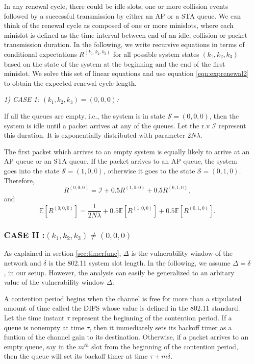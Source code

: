 \documentclass[10pt,conference]{IEEEtran}
\newcommand{\renew}{{R}}
\newcommand{\state}{\mathcal{S}}
\newcommand{\idletime}{\mathcal{I}}
\begin{document}
In any renewal cycle, there could be idle slots, one or more collision events followed by a successful transmission by either an AP or a STA queue.
 We can think of the renewal cycle as composed of one or more minislots, where each minislot is defined as the time interval between end of an idle, collision or  packet transmission duration.
 In the following, we write recursive equations in terms of conditional expectations $\renew^{(k_{1},k_{2},k_{3})}$ for all possible system states $(k_{1},k_{2},k_{3})$ based on the state of the system at 
the beginning and the end of the first minislot. 
We solve this set of linear equations and use equation \ref{eqn:exprenewal2} to obtain the expected renewal cycle length.

 \emph{1) CASE 1: $(k_1,k_2,k_3)=(0,0,0)$:}

  If all the queues are empty, i.e., the system is in state $\state=(0,0,0)$, then the system is idle until a packet arrives at any of the queues.
 Let the r.v $\idletime$ represent this duration. It is exponentially distributed with parameter $2N\lambda$.

The first packet which arrives to an empty system is equally likely to arrive at an AP queue or an STA queue. If the packet arrives to an AP queue, the system goes into the state $\state=(1,0,0)$, otherwise it goes to the 
state $\state=(0,1,0)$.
 Therefore,
   \begin{equation}
    \renew^{(0,0,0)}= \idletime + 0.5\renew^{(1,0,0)} + 0.5\renew^{(0,1,0)},
   \end{equation}
and
\begin{equation}
    \mathbb{E}[\renew^{(0,0,0)}]= \frac{1}{2N\lambda} + 0.5\mathbb{E}[\renew^{(1,0,0)}] + 0.5\mathbb{E}[\renew^{(0,1,0)}].
\label{eqn:renewalempty}
   \end{equation}

\subsubsection{CASE II :$(k_1,k_2,k_3)\neq(0,0,0)$}
As explained in section \ref{sec:timerfunc}, $\Delta$ is the vulnerability window of the network and $\delta$ is the 802.11 system slot length. In the following, we assume $\Delta=\delta$, in our setup.
However, the analysis can easily be generalized to an arbitary value of the vulnerability window $\Delta$.

 A contention period begins when the channel is free for more than a stipulated amount of time called the DIFS whose value is defined in the 802.11 standard. Let the time instant $\tau$ represent the beginning of the contention period. 
 If a queue is nonempty at time $\tau$, then it immediately sets its backoff timer as a funtion of the channel gain to its destination. Otherwise, if a packet arrives to an empty queue, say in the  $m^{th}$ slot from the beginning of the contention period,
 then the queue will set its backoff timer at time $\tau+m\delta$. 
\end{document}
